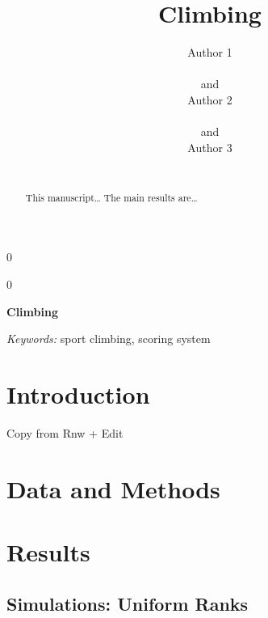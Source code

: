 \documentclass[12pt]{article}
\newcommand{\blind}{0}
\begin{document}
\def\spacingset#1{\renewcommand{\baselinestretch}%
{#1}\small\normalsize} \spacingset{1}



\blind
{
  \title{\bf Climbing}

  \author{
        Author 1 \\
    \\
     and \\     Author 2 \\
    \\
     and \\     Author 3 \\
    \\
      }
  \maketitle
} \fi

\blind
{
  \bigskip
  \bigskip
  \bigskip
  \begin{center}
    {\LARGE\bf Climbing}
  \end{center}
  \medskip
} \fi

\bigskip
\begin{abstract}
This manuscript\ldots{} The main results are\ldots{}
\end{abstract}

\noindent%
{\it Keywords:} sport climbing, scoring system
\vfill

\newpage
\spacingset{1.45} %

\hypertarget{introduction}{%
\section{Introduction}\label{introduction}}

Copy from Rnw + Edit

\hypertarget{data-and-methods}{%
\section{Data and Methods}\label{data-and-methods}}

\hypertarget{results}{%
\section{Results}\label{results}}

\hypertarget{simulations-uniform-ranks}{%
\subsection{Simulations: Uniform
Ranks}\label{simulations-uniform-ranks}}
\end{document}
